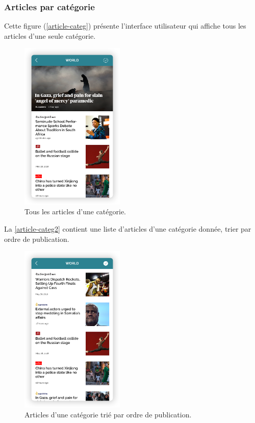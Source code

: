 \subsubsection{Articles par catégorie}
Cette figure (\autoref{article-categ}) présente l'interface utilisateur qui affiche tous les articles d'une seule catégorie. 
\begin{figure}[H]
    \centering
    \includegraphics[width=140pt]{img/chapter4/feedny/en-categ-articles1.png}
    \caption{Tous les articles d'une catégorie.}
    \label{article-categ}
\end{figure}

La \autoref{article-categ2} contient une liste d'articles d'une catégorie donnée, trier par ordre de publication.
\begin{figure}[H]
    \centering
    \includegraphics[width=140pt]{img/chapter4/feedny/en-categ-articles.png}
    \caption{Articles d'une catégorie trié par ordre de publication.}
    \label{article-categ2}
\end{figure}

